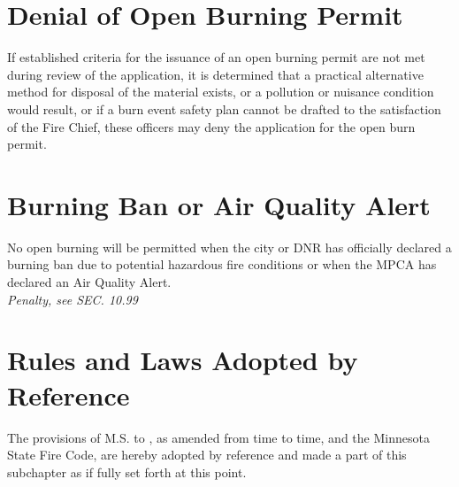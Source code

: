 \section{Denial of Open Burning Permit}
If established criteria for the issuance of an open burning permit are not met during review of the application, it is determined that a practical alternative method for disposal of the material exists, or a pollution or nuisance condition would result, or if a burn event safety plan cannot be drafted to the satisfaction of the Fire Chief, these officers may deny the application for the open burn permit.
\section{Burning Ban or Air Quality Alert}
No open burning  will be permitted when the city or DNR has officially declared a burning ban due to potential hazardous fire conditions or when the MPCA has declared an Air Quality Alert.\\
\emph{Penalty, see SEC. 10.99}
\section{Rules and Laws Adopted by Reference}
The provisions of M.S.  to , as amended from time to time, and the Minnesota State Fire Code, are hereby adopted by reference and made a part of this subchapter as if fully set forth at this point.
